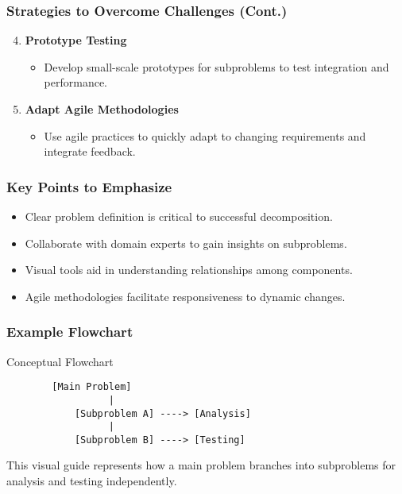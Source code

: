 \documentclass[aspectratio=169]{beamer}
\begin{document}
\begin{frame}[fragile]
    \frametitle{Strategies to Overcome Challenges (Cont.)}
    \begin{enumerate}
        \setcounter{enumi}{3}
        \item \textbf{Prototype Testing}
            \begin{itemize}
                \item Develop small-scale prototypes for subproblems to test integration and performance.
            \end{itemize}

        \item \textbf{Adapt Agile Methodologies}
            \begin{itemize}
                \item Use agile practices to quickly adapt to changing requirements and integrate feedback.
            \end{itemize}
    \end{enumerate}
\end{frame}

\begin{frame}[fragile]
    \frametitle{Key Points to Emphasize}
    \begin{itemize}
        \item Clear problem definition is critical to successful decomposition.
        \item Collaborate with domain experts to gain insights on subproblems.
        \item Visual tools aid in understanding relationships among components.
        \item Agile methodologies facilitate responsiveness to dynamic changes.
    \end{itemize}
\end{frame}

\begin{frame}[fragile]
    \frametitle{Example Flowchart}
    \begin{block}{Conceptual Flowchart}
        \begin{verbatim}
        [Main Problem]
                  |
            [Subproblem A] ----> [Analysis]
                  |
            [Subproblem B] ----> [Testing]
        \end{verbatim}
    \end{block}
    This visual guide represents how a main problem branches into subproblems for analysis and testing independently.
\end{frame}
\end{document}
